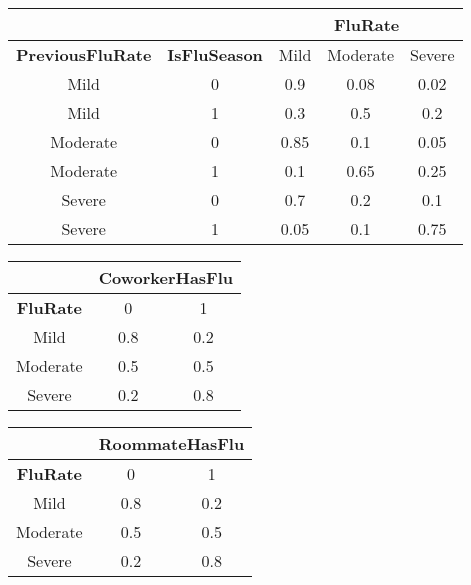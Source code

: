 \documentclass[12pt]{article}
\begin{document}
\begin{center}
\begin{tabular}{|c|c|c|c|c|}
\hline 
\multicolumn{2}{|c|}{} & \multicolumn{3}{|c|}{\textbf{FluRate}} \\ 
\hline 
\textbf{PreviousFluRate} & \textbf{IsFluSeason} & Mild & Moderate & Severe \\ 
\hline 
Mild & 0 & 0.9 & 0.08 & 0.02 \\ 
\hline 
Mild & 1 & 0.3 & 0.5 & 0.2 \\ 
\hline 
Moderate & 0 & 0.85 & 0.1 & 0.05 \\ 
\hline 
Moderate & 1 & 0.1 & 0.65 & 0.25 \\ 
\hline 
Severe & 0 & 0.7 & 0.2 & 0.1 \\ 
\hline 
Severe & 1 & 0.05 & 0.1 & 0.75 \\ 
\hline 
\end{tabular} 
\end{center}

\begin{center}
\begin{tabular}{|c|c|c|}
\hline 
 & \multicolumn{2}{|c|}{\textbf{CoworkerHasFlu}} \\ 
\hline 
\textbf{FluRate} & 0 & 1 \\ 
\hline 
Mild & 0.8 & 0.2 \\ 
\hline 
Moderate & 0.5 & 0.5 \\ 
\hline 
Severe & 0.2 & 0.8 \\ 
\hline 
\end{tabular} 
\end{center}

\begin{center}
\begin{tabular}{|c|c|c|}
\hline 
 & \multicolumn{2}{|c|}{\textbf{RoommateHasFlu}} \\ 
\hline 
\textbf{FluRate} & 0 & 1 \\ 
\hline 
Mild & 0.8 & 0.2 \\ 
\hline 
Moderate & 0.5 & 0.5 \\ 
\hline 
Severe & 0.2 & 0.8 \\ 
\hline 
\end{tabular}
\end{center} 
\end{document}
